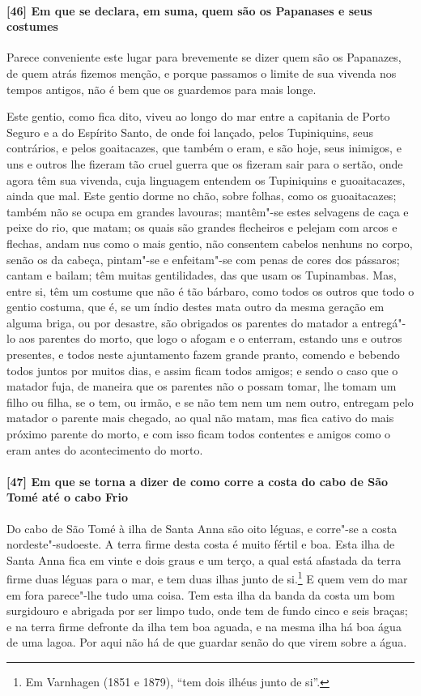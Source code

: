 \paragraph{[46] Em que se declara, em suma, quem são os Papanases e seus costumes} \quad
Parece conveniente este lugar para brevemente se dizer quem são os Papanazes, de quem
atrás fizemos menção, e porque passamos o limite de sua vivenda nos tempos antigos, não é
bem que os guardemos para mais longe.

Este gentio, como fica dito, viveu ao longo do mar entre a capitania de Porto Seguro e a
do Espírito Santo, de onde foi lançado, pelos Tupiniquins, seus contrários, e pelos
goaitacazes, que também o eram, e são hoje, seus inimigos, e uns e outros lhe fizeram tão
cruel guerra que os fizeram sair para o sertão, onde agora têm sua vivenda, cuja linguagem
entendem os Tupiniquins e guoaitacazes, ainda que mal. Este gentio dorme no chão, sobre
folhas, como os guoaitacazes; também não se ocupa em grandes lavouras; mantêm"-se estes
selvagens de caça e peixe do rio, que matam; os quais são grandes flecheiros e pelejam com
arcos e flechas, andam nus como o mais gentio, não consentem cabelos nenhuns no corpo,
senão os da cabeça, pintam"-se e enfeitam"-se com penas de cores dos pássaros; cantam e
bailam; têm muitas gentilidades, das que usam os Tupinambas. Mas, entre si, têm um costume
que não é tão bárbaro, como todos os outros que todo o gentio costuma, que é, se um índio
destes mata outro da mesma geração em alguma briga, ou por desastre, são obrigados os
parentes do matador a entregá"-lo aos parentes do morto, que logo o afogam e o enterram,
estando uns e outros presentes, e todos neste ajuntamento fazem grande pranto, comendo e
bebendo todos juntos por muitos dias, e assim ficam todos amigos; e sendo o caso que o
matador fuja, de maneira que os parentes não o possam tomar, lhe tomam um filho ou filha,
se o tem, ou irmão, e se não tem nem um nem outro, entregam pelo matador o parente mais
chegado, ao qual não matam, mas fica cativo do mais próximo parente do morto, e com isso
ficam todos contentes e amigos como o eram antes do acontecimento do morto.

\paragraph{[47] Em que se torna a dizer de como corre a costa do cabo de São Tomé até o cabo
Frio} \quad
Do cabo de São Tomé à ilha de Santa Anna são oito léguas, e corre"-se a costa
nordeste"-sudoeste. A terra firme desta costa é muito fértil e boa. Esta ilha de Santa Anna
fica em vinte e dois graus e um terço, a qual está afastada da terra firme duas léguas
para o mar, e tem duas ilhas junto de si.\footnote{ Em Varnhagen (1851 e 1879), ``tem dois
ilhéus junto de si''.} E quem vem do mar em fora parece"-lhe tudo uma coisa. Tem esta ilha
da banda da costa um bom surgidouro e abrigada por ser limpo tudo, onde tem de fundo cinco
e seis braças; e na terra firme defronte da ilha tem boa aguada, e na mesma ilha há boa
água de uma lagoa. Por aqui não há de que guardar senão do que virem sobre a água.


